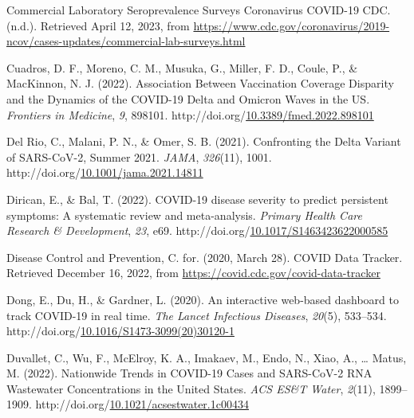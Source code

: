 \documentclass[12pt,twoside]{smiththesis}
\newlength{\cslhangindent}
\newenvironment{CSLReferences}[2] %
 {%
\setlength{\parindent}{0pt}
\ifodd #1 \everypar{\setlength{\hangindent}{\cslhangindent}}\ignorespaces\fi
\ifnum #2 > 0
\setlength{\parskip}{#2\baselineskip}
  \fi
}%
{}
\begin{document}
\begin{CSLReferences}{1}{0}
\leavevmode{}%
Commercial {Laboratory Seroprevalence Surveys} \textbar{} {Coronavirus} \textbar{} {COVID-19} \textbar{} {CDC}. (n.d.). Retrieved April 12, 2023, from \url{https://www.cdc.gov/coronavirus/2019-ncov/cases-updates/commercial-lab-surveys.html}

\leavevmode{}%
Cuadros, D. F., Moreno, C. M., Musuka, G., Miller, F. D., Coule, P., \& MacKinnon, N. J. (2022). Association {Between Vaccination Coverage Disparity} and the {Dynamics} of the {COVID-19 Delta} and {Omicron Waves} in the {US}. \emph{Frontiers in Medicine}, \emph{9}, 898101. http://doi.org/\href{https://doi.org/10.3389/fmed.2022.898101}{10.3389/fmed.2022.898101}

\leavevmode{}%
Del Rio, C., Malani, P. N., \& Omer, S. B. (2021). Confronting the {Delta Variant} of {SARS-CoV-2}, {Summer} 2021. \emph{JAMA}, \emph{326}(11), 1001. http://doi.org/\href{https://doi.org/10.1001/jama.2021.14811}{10.1001/jama.2021.14811}

\leavevmode{}%
Dirican, E., \& Bal, T. (2022). {COVID-19} disease severity to predict persistent symptoms: A systematic review and meta-analysis. \emph{Primary Health Care Research \& Development}, \emph{23}, e69. http://doi.org/\href{https://doi.org/10.1017/S1463423622000585}{10.1017/S1463423622000585}

\leavevmode{}%
Disease Control and Prevention, C. for. (2020, March 28). {COVID Data Tracker}. Retrieved December 16, 2022, from \url{https://covid.cdc.gov/covid-data-tracker}

\leavevmode{}%
Dong, E., Du, H., \& Gardner, L. (2020). An interactive web-based dashboard to track {COVID-19} in real time. \emph{The Lancet Infectious Diseases}, \emph{20}(5), 533--534. http://doi.org/\href{https://doi.org/10.1016/S1473-3099(20)30120-1}{10.1016/S1473-3099(20)30120-1}

\leavevmode{}%
Duvallet, C., Wu, F., McElroy, K. A., Imakaev, M., Endo, N., Xiao, A., \ldots{} Matus, M. (2022). Nationwide {Trends} in {COVID-19 Cases} and {SARS-CoV-2 RNA Wastewater Concentrations} in the {United States}. \emph{ACS ES\&T Water}, \emph{2}(11), 1899--1909. http://doi.org/\href{https://doi.org/10.1021/acsestwater.1c00434}{10.1021/acsestwater.1c00434}


\end{CSLReferences}
\end{document}

